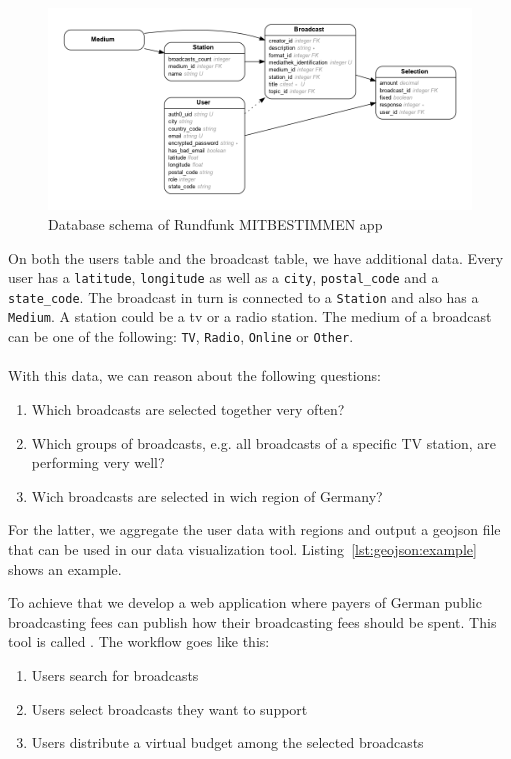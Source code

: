 \documentclass{article}
\begin{document}
\begin{figure}[h]
\centering
  \includegraphics[width=\textwidth]{images/er}
  \caption{Database schema of Rundfunk MITBESTIMMEN app}
  \label{fig:data:rundfunk}
\end{figure}

On both the users table and the broadcast table, we have additional data.
Every user has a \texttt{latitude}, \texttt{longitude} as well as a \texttt{city}, \texttt{postal\_code} and a \texttt{state\_code}.
The broadcast in turn is connected to a \texttt{Station} and also has a \texttt{Medium}.
A station could be a tv or a radio station.
The medium of a broadcast can be one of the following: \texttt{TV}, \texttt{Radio}, \texttt{Online} or \texttt{Other}.
\\
\\
With this data, we can reason about the following questions:
\begin{enumerate}
  \item
    Which broadcasts are selected together very often?
  \item
    Which groups of broadcasts, e.g. all broadcasts of a specific TV station, are performing very well?
  \item
    Wich broadcasts are selected in wich region of Germany?
\end{enumerate}

For the latter, we aggregate the user data with regions and output a geojson file that can be used in our data visualization tool.
Listing~\ref{lst:geojson:example} shows an example.



To achieve that we develop a web application where payers of German public broadcasting fees can publish how their broadcasting fees should be spent.
This tool is called \rufu{}.
The workflow goes like this:
\begin{enumerate}
\item Users search for broadcasts
\item Users select broadcasts they want to support
\item Users distribute a virtual budget among the selected broadcasts
\end{enumerate}
\end{document}
